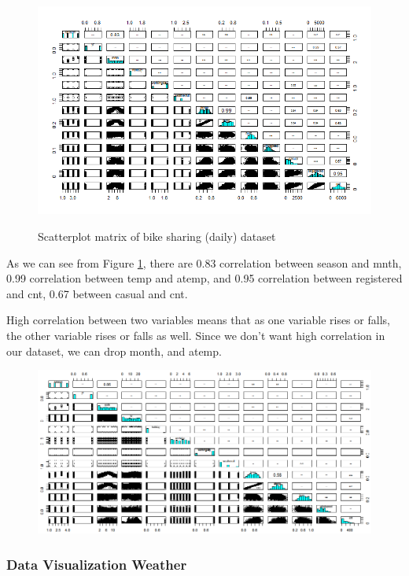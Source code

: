 \documentclass[12pt]{article}
\begin{document}
\begin{figure}[H]
	\includegraphics[scale=0.6]{figures/scatterplot.png}
	\label{fig:scatterplot}
	\caption{Scatterplot matrix of bike sharing (daily) dataset}
\end{figure}

As we can see from Figure \ref{fig:scatterplot}, there are 0.83 correlation between season and mnth, 0.99 correlation between temp and atemp, and 0.95 correlation between registered and cnt, 0.67 between casual and cnt.

High correlation between two variables means that as one variable rises or falls, the other variable rises or falls as well. Since we don't want high correlation in our dataset, we can drop month, and atemp.
\begin{figure}[H]
	\includegraphics[scale=0.6]{figures/scatterplot_col_season.png}
\end{figure}

\subsubsection{Data Visualization Weather}
\end{document}
